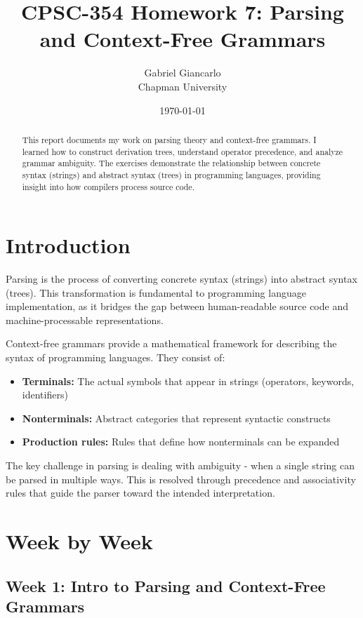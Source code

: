 \documentclass{article}
\title{CPSC-354 Homework 7: Parsing and Context-Free Grammars}
\author{Gabriel Giancarlo \\ Chapman University}
\date{\today}
\theoremstyle{plain}
\theoremstyle{definition}
\theoremstyle{remark}
\begin{document}
\maketitle

\begin{abstract}
This report documents my work on parsing theory and context-free grammars. I learned how to construct derivation trees, understand operator precedence, and analyze grammar ambiguity. The exercises demonstrate the relationship between concrete syntax (strings) and abstract syntax (trees) in programming languages, providing insight into how compilers process source code.
\end{abstract}

\setcounter{tocdepth}{3}
\tableofcontents

\section{Introduction}\label{intro}

Parsing is the process of converting concrete syntax (strings) into abstract syntax (trees). This transformation is fundamental to programming language implementation, as it bridges the gap between human-readable source code and machine-processable representations.

Context-free grammars provide a mathematical framework for describing the syntax of programming languages. They consist of:
\begin{itemize}
\item \textbf{Terminals:} The actual symbols that appear in strings (operators, keywords, identifiers)
\item \textbf{Nonterminals:} Abstract categories that represent syntactic constructs
\item \textbf{Production rules:} Rules that define how nonterminals can be expanded
\end{itemize}

The key challenge in parsing is dealing with ambiguity - when a single string can be parsed in multiple ways. This is resolved through precedence and associativity rules that guide the parser toward the intended interpretation.

\section{Week by Week}\label{homework}

\subsection{Week 1: Intro to Parsing and Context-Free Grammars}
\end{document}
